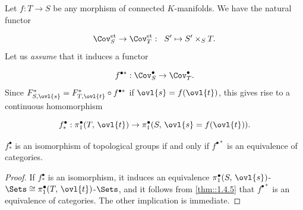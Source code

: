 \begin{para}\label{para::1.4.10} Let $f:T\to S$ be any morphism of connected
 $K$-manifolds. We have the natural functor 

\begin{equation*}
 \Cov^{\mathrm{et}}_S\to \Cov^{\mathrm{et}}_T:\;\; S'\mapsto S'\times_S T.
\end{equation*}
Let us {\it assume} that it induces a functor 

\begin{equation*}
 f^{\bullet\ast}: \Cov^\bullet_S\to \Cov^\bullet_T.
\end{equation*}
Since
$F^\ast_{S,\ovl{s}}=F^\ast_{T,\ovl{t}}\circ f^{\bullet\ast}$ if
$\ovl{s}=f(\ovl{t})$, this gives rise to a continuous homomorphism

\begin{equation*}
f^\bullet_\ast :\pi_1^\bullet(T,\,\ovl{t})\to
 \pi_1^\bullet(S,\,\ovl{s}=f(\ovl{t})).
\end{equation*}
\end{para}

\begin{cor}\label{cor::1.4.11} $f^\bullet_\ast$ is an isomorphism of
 topological groups if and only if $f^{\bullet\ast}$ 
 is an equivalence of categories. 
\end{cor}

\begin{proof}
 If $f^\bullet_\ast$ is an isomorphism, it induces an equivalence 
 $\pi_1^\bullet(S,\,\ovl{s})$-$\Sets\cong
 \pi_1^\bullet(T,\,\ovl{t})$-$\Sets$, and it follows from \ref{thm::1.4.5} that
 $f^{\bullet\ast}$ is an equivalence of categories. The other
 implication is immediate.
\end{proof}

